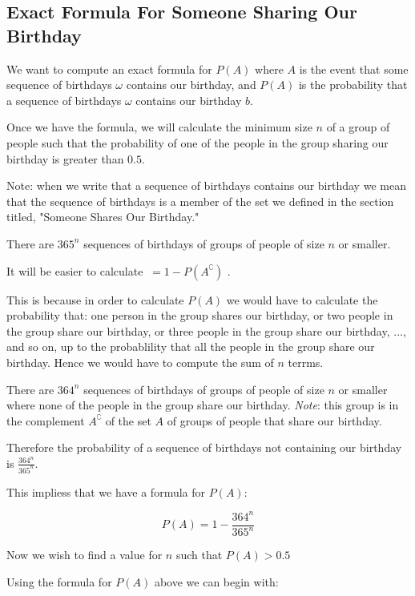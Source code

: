 \documentclass[a4paper,11pt]{article}
\begin{document}
\subsection{Exact Formula For Someone Sharing Our Birthday}
We want to compute an exact formula for $P\left( A \right)$ where
$A$ is the event that some sequence of birthdays $\omega$ contains
our birthday, and $P\left( A \right)$ is the probability that a
sequence of birthdays $\omega$ contains our birthday $b$.

Once we have the formula, we will calculate the minimum size $n$
of a group of people such that the probability of one of the 
people in the group sharing our birthday is greater than $0.5$.

Note: when we write that a sequence of birthdays contains our birthday
we mean that the sequence of birthdays is a member of the set we
defined in the section titled, "Someone Shares Our Birthday."

There are $365^{n}$ sequences of birthdays of groups of people of size
$n$ or smaller.

It will be easier to calculate $\ = 1 - P\left( A^{\complement} \right)$ .

This is because in order to calculate $P\left(A\right)$ we would have
to calculate the probability that: one person in the group
shares our birthday, or two people in the group share our birthday, or
three people in the group share our birthday, ..., and so on,  up
to the probablility that all the people in the group share our birthday.
Hence we would have to compute the sum of $n$ terrms.

There are $364^{n}$ sequences of birthdays of groups of people of
size $n$ or smaller where none of the people in the group share our
birthday.  \textit{Note}: this group is in the complement $A^{\complement}$
of the set $A$ of groups of people that share our birthday.  


Therefore the probability of a sequence of birthdays not containing
our birthday is $\frac{364^{n}}{365^{n}}$.

This impliess that we have a formula for $P \left( A \right)$:

\begin{equation}
  P\left( A \right) = 1 - \frac{364^{n}}{365^{n}}
\end{equation}

Now we wish to find a value for $n$ such that $P\left( A \right) > 0.5$

Using the formula for $P\left( A \right)$ above we can begin with:
\end{document}
